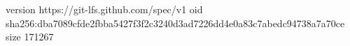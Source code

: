 version https://git-lfs.github.com/spec/v1
oid sha256:dba7089cfde2fbba5427f3f2c3240d3ad7226dd4e0a83c7abedc94738a7a70ce
size 171267
